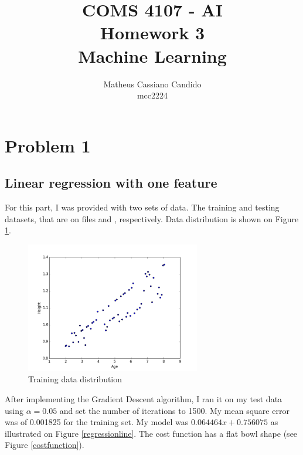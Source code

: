 \documentclass{article}
\begin{document}
\title{COMS 4107 - AI\\
Homework 3\\
Machine Learning}
\author{Matheus Cassiano Candido\\
mcc2224}

\maketitle

\section{Problem 1}

\subsection{Linear regression with one feature}
For this part, I was provided with two sets of data. The training and testing datasets, that are on files  and , respectively. Data distribution is shown on Figure \ref{p1distribution}.

\begin{figure}[htb]
    \centering
    \includegraphics[width=3.0in]{p1_distribution}
    \caption{Training data distribution}
    \label{p1distribution}
\end{figure}

After implementing the Gradient Descent algorithm, I ran it on my test data using $\alpha = 0.05$ and set the number of iterations to 1500. My mean square error was of 0.001825 for the training set. My model was $0.064464x + 0.756075$ as illustrated on Figure \ref{regressionline}. The cost function has a flat bowl shape (see Figure \ref{costfunction}).
\end{document}
